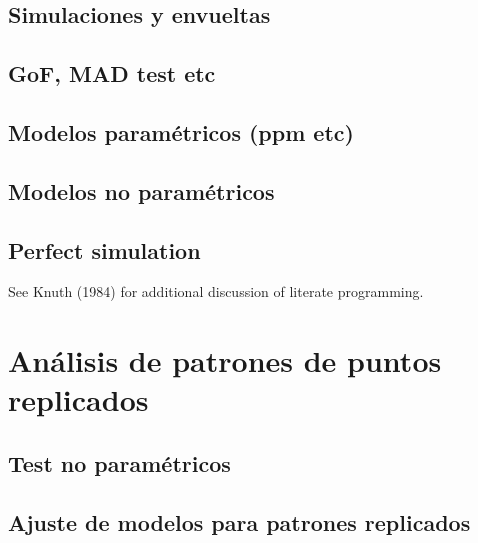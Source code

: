 \documentclass[
  letterpaper,
  DIV=11,
  numbers=noendperiod]{scrreprt}
\begin{document}
\hypertarget{simulaciones-y-envueltas}{%
\section{Simulaciones y envueltas}\label{simulaciones-y-envueltas}}

\hypertarget{gof-mad-test-etc}{%
\section{GoF, MAD test etc}\label{gof-mad-test-etc}}

\hypertarget{modelos-paramuxe9tricos-ppm-etc}{%
\section{Modelos paramétricos (ppm
etc)}\label{modelos-paramuxe9tricos-ppm-etc}}

\hypertarget{modelos-no-paramuxe9tricos}{%
\section{Modelos no paramétricos}\label{modelos-no-paramuxe9tricos}}

\hypertarget{perfect-simulation}{%
\section{Perfect simulation}\label{perfect-simulation}}

See Knuth (1984) for additional discussion of literate programming.


\hypertarget{anuxe1lisis-de-patrones-de-puntos-replicados}{%
\chapter{Análisis de patrones de puntos
replicados}\label{anuxe1lisis-de-patrones-de-puntos-replicados}}

\hypertarget{test-no-paramuxe9tricos}{%
\section{Test no paramétricos}\label{test-no-paramuxe9tricos}}

\hypertarget{ajuste-de-modelos-para-patrones-replicados}{%
\section{Ajuste de modelos para patrones
replicados}\label{ajuste-de-modelos-para-patrones-replicados}}
\end{document}
